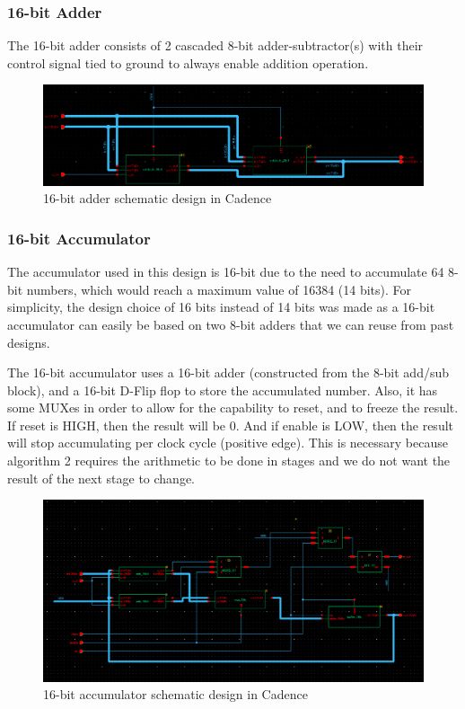 \documentclass[letterpaper, 11pt]{article}
\begin{document}
	\subsubsection{16-bit Adder}
	The 16-bit adder consists of 2 cascaded 8-bit adder-subtractor(s) with their control signal tied to ground to always enable addition operation. 
	
	\begin{figure}[htb!]
		\centering
		\includegraphics[width=0.85\linewidth]{report_pics/add16b_schem.png}
		\caption{16-bit adder schematic design in Cadence}
		\label{fig6}
	\end{figure}
	
	\newpage
	\subsubsection{16-bit Accumulator}
	The accumulator used in this design is 16-bit due to the need to accumulate 64 8-bit numbers, which would reach a maximum value of 16384 (14 bits). For simplicity, the design choice of 16 bits instead of 14 bits was made as a 16-bit accumulator can easily be based on two 8-bit adders that we can reuse from past designs. 
	
	The 16-bit accumulator uses a 16-bit adder (constructed from the 8-bit add/sub block), and a 16-bit D-Flip flop to store the accumulated number. Also, it has some MUXes in order to allow for the capability to reset, and to freeze the result. If reset is HIGH, then the result will be 0. And if enable is LOW, then the result will stop accumulating per clock cycle (positive edge). This is necessary because algorithm 2 requires the arithmetic to be done in stages and we do not want the result of the next stage to change.
	
	\begin{figure}[htb!]
		\centering
		\includegraphics[width=0.85\linewidth]{report_pics/accum16b_schem.png}
		\caption{16-bit accumulator schematic design in Cadence}
		\label{fig7}
	\end{figure}
	
\end{document}
